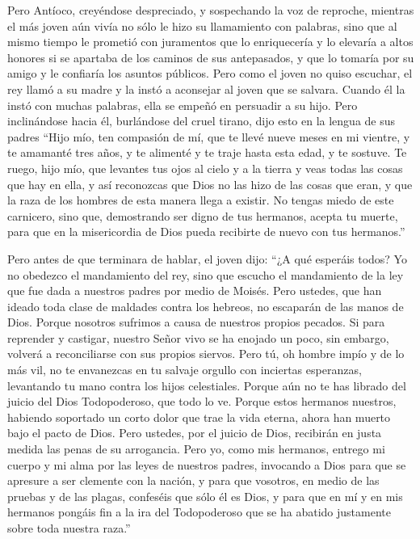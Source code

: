  Pero Antíoco, creyéndose despreciado, y sospechando la
voz de reproche, mientras el más joven aún vivía no sólo le hizo su
llamamiento con palabras, sino que al mismo tiempo le prometió con
juramentos que lo enriquecería y lo elevaría a altos honores si se
apartaba de los caminos de sus antepasados, y que lo tomaría por su
amigo y le confiaría los asuntos públicos.  Pero como el
joven no quiso escuchar, el rey llamó a su madre y la instó a aconsejar
al joven que se salvara.  Cuando él la instó con muchas
palabras, ella se empeñó en persuadir a su hijo.  Pero
inclinándose hacia él, burlándose del cruel tirano, dijo esto en la
lengua de sus padres ``Hijo mío, ten compasión de mí, que te llevé nueve
meses en mi vientre, y te amamanté tres años, y te alimenté y te traje
hasta esta edad, y te sostuve.  Te ruego, hijo mío, que
levantes tus ojos al cielo y a la tierra y veas todas las cosas que hay
en ella, y así reconozcas que Dios no las hizo de las cosas que eran, y
que la raza de los hombres de esta manera llega a existir.
 No tengas miedo de este carnicero, sino que, demostrando
ser digno de tus hermanos, acepta tu muerte, para que en la misericordia
de Dios pueda recibirte de nuevo con tus hermanos.''

 Pero antes de que terminara de hablar, el joven dijo:
``¿A qué esperáis todos? Yo no obedezco el mandamiento del rey, sino que
escucho el mandamiento de la ley que fue dada a nuestros padres por
medio de Moisés.  Pero ustedes, que han ideado toda clase
de maldades contra los hebreos, no escaparán de las manos de Dios.
 Porque nosotros sufrimos a causa de nuestros propios
pecados.  Si para reprender y castigar, nuestro Señor
vivo se ha enojado un poco, sin embargo, volverá a reconciliarse con sus
propios siervos.  Pero tú, oh hombre impío y de lo más
vil, no te envanezcas en tu salvaje orgullo con inciertas esperanzas,
levantando tu mano contra los hijos celestiales.  Porque
aún no te has librado del juicio del Dios Todopoderoso, que todo lo ve.
 Porque estos hermanos nuestros, habiendo soportado un
corto dolor que trae la vida eterna, ahora han muerto bajo el pacto de
Dios. Pero ustedes, por el juicio de Dios, recibirán en justa medida las
penas de su arrogancia.  Pero yo, como mis hermanos,
entrego mi cuerpo y mi alma por las leyes de nuestros padres, invocando
a Dios para que se apresure a ser clemente con la nación, y para que
vosotros, en medio de las pruebas y de las plagas, confeséis que sólo él
es Dios,  y para que en mí y en mis hermanos pongáis fin
a la ira del Todopoderoso que se ha abatido justamente sobre toda
nuestra raza.''

